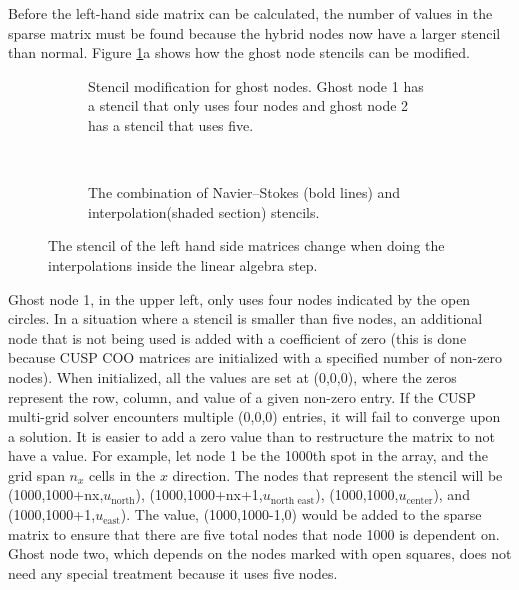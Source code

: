 Before the left-hand side matrix can be calculated, the number of values in the sparse matrix must be found because the hybrid nodes now have a larger stencil than normal. 
Figure \ref{fig:ID combined stencil}a shows how the ghost node stencils can be modified. 
\begin{figure}[!htb]
	\centering
	\begin{subfigure}{0.4\textwidth}
		
		\caption{Stencil modification for ghost nodes. Ghost node 1 has a stencil that only uses four nodes and ghost node 2 has a stencil that uses five.}		
	\end{subfigure}
	~
	\begin{subfigure}{0.4\textwidth}
		
		\caption{The combination of Navier--Stokes (bold lines) and interpolation(shaded section) stencils.}		
	\end{subfigure}
	\caption{The stencil of the left hand side matrices change when doing the interpolations inside the linear algebra step.}
	\label{fig:ID combined stencil}
\end{figure}
Ghost node 1, in the upper left, only uses four nodes indicated by the open circles. 
In a situation where a stencil is smaller than five nodes, an additional node that is not being used is added with a coefficient of zero (this is done because CUSP COO matrices are initialized with a specified number of non-zero nodes).
When initialized, all the values are set at (0,0,0), where the zeros represent the row, column, and value of a given non-zero entry.
If the CUSP multi-grid solver encounters multiple (0,0,0) entries, it will fail to converge upon a solution.
It is easier to add a zero value than to restructure the matrix to not have a value.
For example, let node 1 be the 1000th spot in the array, and the grid span $n_x$ cells in the $x$ direction.
The nodes that represent the stencil will be (1000,1000+nx,$u_{\text{north}}$), (1000,1000+nx+1,$u_{\text{north east}}$), (1000,1000,$u_{\text{center}}$), and (1000,1000+1,$u_{\text{east}}$). 
The value, (1000,1000-1,0) would be added to the sparse matrix to ensure that there are five total nodes that node 1000 is dependent on. 
Ghost node two, which depends on the nodes marked with open squares, does not need any special treatment because it uses five nodes. 

